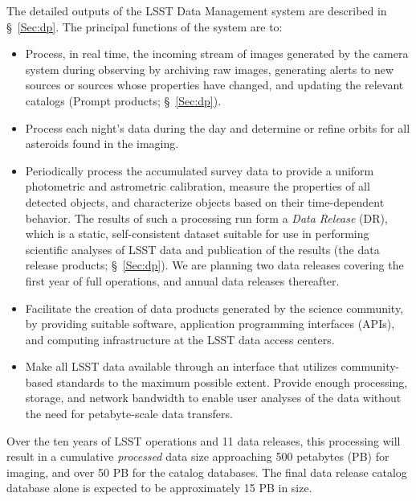 The detailed outputs of the LSST Data Management system are described
in \S~\ref{Sec:dp}.  The principal functions of the system are to:
\begin{itemize}
\item Process, in real time, the incoming stream of images generated
  by the camera system during observing by archiving raw images,
  generating alerts to new sources or sources whose properties have
  changed, and updating the relevant catalogs (Prompt  products;
  \S~\ref{Sec:dp}).
\item Process each night's data during the day and determine or refine
  orbits for all asteroids found in the imaging.
\item Periodically process the accumulated survey data to provide a
  uniform photometric and astrometric calibration, measure the
  properties of all detected objects, and characterize objects based
  on their time-dependent behavior. The results of such a processing
  run form a \emph{Data Release} (DR), which is a static,
  self-consistent dataset suitable for use in performing scientific
  analyses of LSST data and publication of the results (the data
  release products; \S~\ref{Sec:dp}). We are planning two data
  releases covering the first year of full operations, and annual data
  releases thereafter.
\item Facilitate the creation of data
  products generated by the science community, by providing suitable software,
  application programming interfaces (APIs),
and computing infrastructure at the LSST data access centers.
\item Make all LSST data available through an interface that utilizes
community-based standards   to the maximum possible extent. Provide
  enough processing, storage, and network bandwidth to enable user
  analyses of the data without the need for petabyte-scale data
  transfers.
\end{itemize}

Over the ten years of LSST operations and 11 data releases, this processing will result in a cumulative \emph{processed} data size
approaching 500 petabytes (PB) for imaging, and over 50 PB for the
catalog databases. The final data release catalog database alone is expected
to be approximately 15 PB in size.
\\

